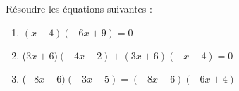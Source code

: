 \documentclass[a4paper,11pt,exos]{nsi} %
\begin{document}
\maketitle




\begin{exercice}
    Résoudre les équations suivantes :
        \begin{enumerate}
            \item $(x-4)(-6x+9)=0$
            \item  ($3x+6)( -4x-2)+(3x+6)(-x-4)=0$
	        \item  ($-8x-6)( -3x-5)=( -8x-6)( -6x+4)$
        \end{enumerate}
    
\end{exercice}
\end{document}
